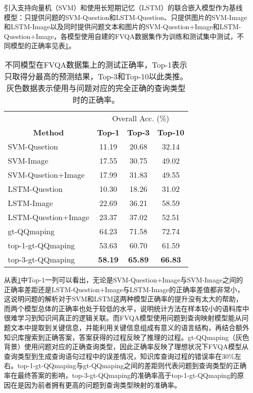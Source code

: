 引入支持向量机（SVM）和使用长短期记忆（LSTM）的联合嵌入模型作为基线模型：只提供问题的SVM-Question和LSTM-Question、只提供图片的SVM-Image和LSTM-Image以及同时提供问题文本和图片的SVM-Question+Image和LSTM-Question+Image，各模型使用自建的FVQA数据集作为训练和测试集中测试，不同模型的正确率见表\ref{fvqa_table}。
\begin{table}[H]
\caption{不同模型在FVQA数据集上的测试正确率，Top-1表示只取得分最高的预测结果，Top-3和Top-10以此类推。灰色数据表示使用与问题对应的完全正确的查询类型时的正确率。}
\begin{tabular}{lccc}
\toprule
\multicolumn{1}{c}{} & \multicolumn{3}{c}{Overall Acc. (\%)}\\
\cmidrule(r){2-4}
\multicolumn{1}{c}{\multirow{-2}{*}{\textbf{Method}}} & \textbf{Top-1}& \textbf{Top-3} & \textbf{Top-10} \\
\midrule
SVM-Qusetion        & 11.19 & 20.68 & 32.14 \\
SVM-Image           & 17.55 & 30.75 & 49.02 \\
SVM-Qusetion+Image  & 17.99 & 31.83 & 49.55 \\
LSTM-Question       & 10.30 & 18.26 & 31.02 \\
LSTM-Image          & 22.69 & 36.21 & 58.59 \\
LSTM-Question+Image & 23.37 & 37.02 & 52.51 \\
\midrule
\cellcolor[HTML]{C0C0C0}gt-QQmaping & \cellcolor[HTML]{C0C0C0}64.23 & \cellcolor[HTML]{C0C0C0}71.58 & \cellcolor[HTML]{C0C0C0}72.74 \\
top-1-gt-QQmaping & 53.63 & 60.70 & 61.59 \\ 
top-3-gt-QQmaping & \textbf{58.19} & \textbf{65.89} & \textbf{66.83} \\
\bottomrule
\end{tabular}
\label{fvqa_table} 
\end{table}

从表\ref{fvqa_table}中Top-1一列可以看出，无论是SVM-Question+Image与SVM-Image之间的正确率差距还是LSTM-Question+Image与LSTM-Image的正确率差值都非常小，这说明问题的解析对于SVM和LSTM这两种模型正确率的提升没有太大的帮助，而两个模型总体的正确率也处于较低的水平，说明统计方法在样本较小的语料库中很难学习到知识间真正的逻辑关联。而FVQA模型使用问题到查询映射模型能从问题文本中提取到关键信息，并能利用关键信息组成有意义的语言结构，再结合额外知识库搜索到正确答案，答案获得的过程反映了推理的过程。gt-QQmaping（灰色背景）使用问题对应的正确查询类型，因此正确率反映了理想状况下FVQA模型从查询类型到生成查询语句过程中的误差情况，知识库查询过程的错误率在30\%左右。top-1-gt-QQmaping与gt-QQmaping之间的差距则代表问题到查询类型的正确率在最终答案的影响，top-3-gt-QQmaping的准确率高于top-1-gt-QQmaping的原因在是因为前者拥有更高的问题到查询类型映射的准确率。

